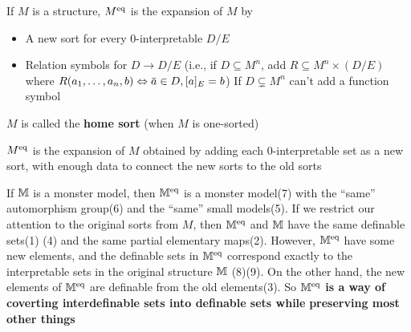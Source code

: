 \documentclass[11pt]{article}
\begin{document}
\begin{definition}[]
If \(M\) is a structure, \(M^{\operatorname{eq}}\) is the expansion of \(M\) by
\begin{itemize}
\item A new sort for every 0-interpretable \(D/E\)
\item Relation symbols for \(D\to D/E\) (i.e., if \(D\subseteq M^n\), add \(R\subseteq M^n\times(D/E)\)
where \(R(a_1,\dots,a_n,b)\Leftrightarrow\bara\in D,[a]_E=b\)) If \(D\subsetneq M^n\) can't add a function symbol
\end{itemize}


\(M\) is called the \textbf{home sort} (when \(M\) is one-sorted)
\end{definition}

\(M^{\operatorname{eq}}\) is the expansion of \(M\) obtained by adding each 0-interpretable set as a new sort,
with enough data to connect the new sorts to the old sorts

If \(\mathbb{M}\) is a monster model, then \(\mathbb{M}^{\operatorname{eq}}\) is a monster model(7) with the ``same'' automorphism
group(6) and the ``same'' small models(5). If we restrict our attention to the original sorts from
\(M\), then \(\mathbb{M}^{\operatorname{eq}}\) and \(\mathbb{M}\) have the same definable sets(1) (4) and the same partial
elementary maps(2). However, \(\mathbb{M}^{\operatorname{eq}}\) have some new elements, and the definable sets
in \(\mathbb{M}^{\operatorname{eq}}\) correspond exactly to the interpretable sets in the original structure \(\mathbb{M}\)
(8)(9). On the other hand, the new elements of \(\mathbb{M}^{\operatorname{eq}}\) are definable from the old
elements(3). So \textbf{\(\mathbb{M}^{\operatorname{eq}}\) is a way of coverting interdefinable sets into definable sets while}
\textbf{preserving most other things}
\end{document}
